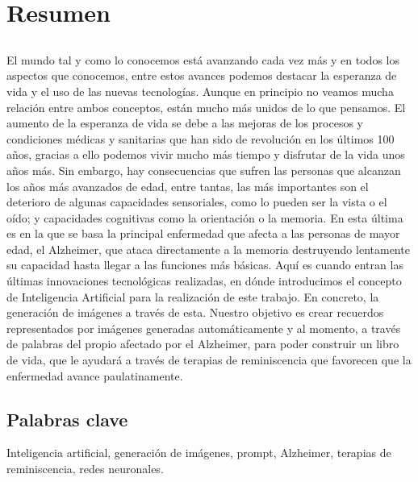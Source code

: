 \chapter*{Resumen}

\section*{\tituloPortadaVal}
El mundo tal y como lo conocemos está avanzando cada vez más y en todos los aspectos que conocemos, entre estos avances podemos destacar la esperanza de vida y el uso de las nuevas tecnologías. Aunque en principio no veamos mucha relación entre ambos conceptos, están mucho más unidos de lo que pensamos. El aumento de la esperanza de vida se debe a las mejoras de los procesos y condiciones médicas y sanitarias que han sido de revolución en los últimos 100 años, gracias a ello podemos vivir mucho más tiempo y disfrutar de la vida unos años más. Sin embargo, hay consecuencias que sufren las personas que alcanzan los años más avanzados de edad, entre tantas, las más importantes son el deterioro de algunas capacidades sensoriales, como lo pueden ser la vista o el oído; y capacidades cognitivas como la orientación o la memoria. En esta última es en la que se basa la principal enfermedad que afecta a las personas de mayor edad, el Alzheimer, que ataca directamente a la memoria destruyendo lentamente su capacidad hasta llegar a las funciones más básicas. Aquí es cuando entran las últimas innovaciones tecnológicas realizadas, en dónde introducimos el concepto de Inteligencia Artificial para la realización de este trabajo. En concreto, la generación de imágenes a través de esta. Nuestro objetivo es crear recuerdos representados por imágenes generadas automáticamente y al momento, a través de palabras del propio afectado por el Alzheimer, para poder construir un libro de vida, que le ayudará a través de terapias de reminiscencia que favorecen que la enfermedad avance paulatinamente. 


\section*{Palabras clave}
   
\noindent Inteligencia artificial, generación de imágenes, prompt, Alzheimer, terapias de reminiscencia, redes neuronales.

   


